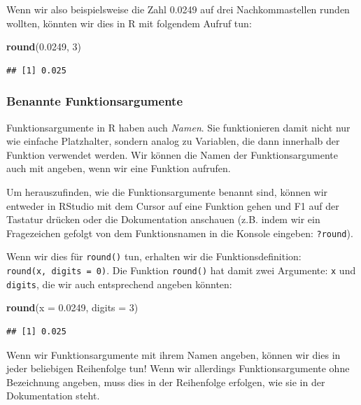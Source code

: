 \documentclass[
  ngerman,
]{book}
\newenvironment{Shaded}{\begin{snugshade}}{\end{snugshade}}
\newcommand{\AttributeTok}[1]{\textcolor[rgb]{0.13,0.29,0.53}{#1}}
\newcommand{\DecValTok}[1]{\textcolor[rgb]{0.00,0.00,0.81}{#1}}
\newcommand{\FloatTok}[1]{\textcolor[rgb]{0.00,0.00,0.81}{#1}}
\newcommand{\FunctionTok}[1]{\textcolor[rgb]{0.13,0.29,0.53}{\textbf{#1}}}
\newcommand{\NormalTok}[1]{#1}
\begin{document}
Wenn wir also beispielsweise die Zahl 0.0249 auf drei Nachkommastellen runden wollten, könnten wir dies in R mit folgendem Aufruf tun:

\begin{Shaded}
\begin{Highlighting}[]
\FunctionTok{round}\NormalTok{(}\FloatTok{0.0249}\NormalTok{, }\DecValTok{3}\NormalTok{)}
\end{Highlighting}
\end{Shaded}

\begin{verbatim}
## [1] 0.025
\end{verbatim}

\subsubsection{Benannte Funktionsargumente}\label{benannte-funktionsargumente}

Funktionsargumente in R haben auch \emph{Namen}. Sie funktionieren damit nicht nur wie einfache Platzhalter, sondern analog zu Variablen, die dann innerhalb der Funktion verwendet werden. Wir können die Namen der Funktionsargumente auch mit angeben, wenn wir eine Funktion aufrufen.

Um herauszufinden, wie die Funktionsargumente benannt sind, können wir entweder in RStudio mit dem Cursor auf eine Funktion gehen und F1 auf der Tastatur drücken oder die Dokumentation anschauen (z.B. indem wir ein Fragezeichen gefolgt von dem Funktionsnamen in die Konsole eingeben: \texttt{?round}).

Wenn wir dies für \texttt{round()} tun, erhalten wir die Funktionsdefinition: \texttt{round(x,\ digits\ =\ 0)}. Die Funktion \texttt{round()} hat damit zwei Argumente: \texttt{x} und \texttt{digits}, die wir auch entsprechend angeben könnten:

\begin{Shaded}
\begin{Highlighting}[]
\FunctionTok{round}\NormalTok{(}\AttributeTok{x =} \FloatTok{0.0249}\NormalTok{, }\AttributeTok{digits =} \DecValTok{3}\NormalTok{)}
\end{Highlighting}
\end{Shaded}

\begin{verbatim}
## [1] 0.025
\end{verbatim}

Wenn wir Funktionsargumente mit ihrem Namen angeben, können wir dies in jeder beliebigen Reihenfolge tun! Wenn wir allerdings Funktionsargumente ohne Bezeichnung angeben, muss dies in der Reihenfolge erfolgen, wie sie in der Dokumentation steht.
\end{document}

